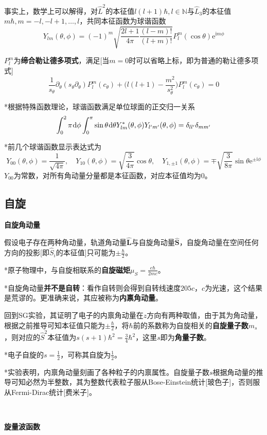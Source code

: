 \documentclass[a4paper,UTF8,fontset=windows]{ctexart}
\newcommand*{\dr}{\hspace{0.07em}\mathrm{d}}
\newcommand*{\ir}{\mathrm{i}}
\newcommand*{\er}{\mathrm{e}}
\newcommand*{\bl}{\mathbf{L}}
\begin{document}
事实上，数学上可以解得，对$\hat{L}^2$的本征值$l(l+1)\hbar,l\in\mathbb{N}$与$\hat{L}_3$的本征值$m\hbar,m=-l,-l+1,\dots,l$，共同本征函数为球谐函数
$$Y_{lm}(\theta,\phi)=(-1)^m\sqrt{\frac{2l+1}{4\pi}\frac{(l-m)!}{(l+m)!}}P_l^m(\cos\theta)\er^{\ir m\phi}$$

$P_l^m$为\textbf{缔合勒让德多项式}，满足[当$m=0$时可以省略上标，即为普通的勒让德多项式]
$$\frac{1}{s_\theta}\partial_\theta(s_\theta\partial_\theta)P_l^m(c_\theta)+\bigg(l(l+1)-\frac{m^2}{s_\theta^2}\bigg)P_l^m(c_\theta)=0$$

*根据特殊函数理论，球谐函数满足单位球面的正交归一关系
$$\int_0^2\pi\dr\phi\int_0^\pi\sin\theta\dr\theta Y_{lm}^*(\theta,\phi)Y_{l'm'}(\theta,\phi)=\delta_{ll'}\delta_{mm'}$$

*前几个球谐函数显示表达式为
$$Y_{00}(\theta,\phi)=\frac{1}{\sqrt{4\pi}},\quad Y_{10}(\theta,\phi)=\sqrt{\frac{3}{4\pi}}\cos\theta,\quad Y_{1,\pm1}(\theta,\phi)=\mp\sqrt{\frac{3}{8\pi}}\sin\theta\er^{\pm\ir\phi}$$
$Y_{00}$为常数，对所有角动量分量都是本征函数，对应本征值均为0。

\subsection{自旋}

\textbf{自旋角动量}

假设电子存在两种角动量，轨道角动量$\hat{\bl}$与自旋角动量$\hat{\mathbf{S}}$，自旋角动量在空间任何方向的投影[即$\hat{S}_i$的本征值]只可能为$\pm\frac{\hbar}{2}$。

*原子物理中，与自旋相联系的\textbf{自旋磁矩}$\mu_S=\frac{e\hbar}{2mc}$。

*自旋角动量\textbf{并不是自转}：看作自转则会得到自转线速度$205c$，$c$为光速，这个结果是荒谬的。更准确来说，其应被称为\textbf{内禀角动量}。

回到SG实验，其证明了电子的内禀角动量在$z$方向有两种取值，由于其为角动量，根据之前推导可知本征值只能为$\pm\frac{\hbar}{2}$，将$\hbar$前的系数称为自旋相关的\textbf{自旋量子数}$m_s$，则对应的$\hat{S}^2$本征值为$s(s+1)\hbar^2=\frac{3}{4}\hbar^2$，这里$s$即为\textbf{角量子数}。

*电子自旋的$s=\frac{1}{2}$，可称其自旋为$\frac{1}{2}$。

*实验表明，内禀角动量刻画了各种粒子的内禀属性。自旋量子数$s$根据角动量的推导可知必然为半整数，其为整数代表粒子服从Bose-Einstein统计[玻色子]，否则服从Fermi-Dirac统计[费米子]。

\

\textbf{旋量波函数}
\end{document}
